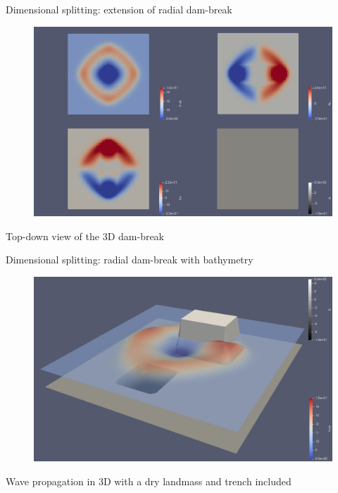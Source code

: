 \documentclass[shortpres]{beamer}
\newcommand{\imgfullscale}{0.75}
\begin{document}
\begin{frame}{Dimensional splitting: extension of radial dam-break}
		\begin{figure}
			\includegraphics[clip, width=\imgfullscale\linewidth]{img/2d_bathy.png}
		\end{figure}
		Top-down view of the 3D dam-break
		
\end{frame}

\begin{frame}{Dimensional splitting: radial dam-break with bathymetry}
		\begin{figure}
			\includegraphics[clip, width=\imgfullscale\linewidth]{img/3d_obstacle.png}
		\end{figure}
		Wave propagation in 3D with a dry landmass and trench included
		
\end{frame}
\end{document}
